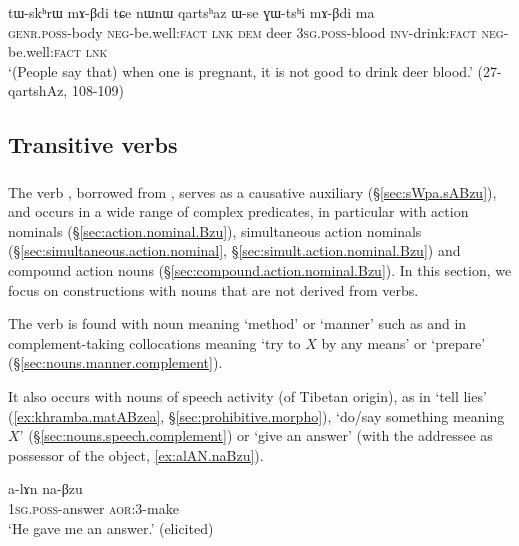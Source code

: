  \begin{exe}
\ex \label{ex:tWskhrW.mABdi}
\gll tɯ-skʰrɯ mɤ-βdi tɕe nɯnɯ qartsʰaz ɯ-se ɣɯ-tsʰi mɤ-βdi ma \\
\textsc{genr}.\textsc{poss}-body \textsc{neg}-be.well:\textsc{fact} \textsc{lnk} \textsc{dem} deer \textsc{3sg}.\textsc{poss}-blood \textsc{inv}-drink:\textsc{fact} \textsc{neg}-be.well:\textsc{fact} \textsc{lnk} \\
\glt `(People say that) when one is pregnant, it is not good to drink deer blood.' (27-qartshAz, 108-109)
\end{exe}


 
\subsection{Transitive verbs}  \label{sec:tr.light.verbs}

\subsubsection{ } \label{sec:Bzu.lv}
The verb , borrowed from , serves as a causative auxiliary (§\ref{sec:sWpa.sABzu}), and occurs in a wide range of complex predicates, in particular with action nominals (§\ref{sec:action.nominal.Bzu}), simultaneous action nominals (§\ref{sec:simultaneous.action.nominal}, §\ref{sec:simult.action.nominal.Bzu}) and compound action nouns (§\ref{sec:compound.action.nominal.Bzu}). In this section, we focus on constructions with nouns that are not derived from verbs.
  
The verb  is found with noun meaning `method' or `manner' such as   and  in complement-taking collocations meaning `try to $X$ by any means' or `prepare' (§\ref{sec:nouns.manner.complement}).
 
It also occurs with nouns of speech activity (of Tibetan origin), as in  `tell lies' (\ref{ex:khramba.matABzea}, §\ref{sec:prohibitive.morpho}),  `do/say something meaning $X$' (§\ref{sec:nouns.speech.complement}) or  `give an answer' (with the addressee as possessor of the object, \ref{ex:alAN.naBzu}).

 \begin{exe}
\ex \label{ex:alAN.naBzu}
\gll  a-lɤn na-βzu  \\
\textsc{1sg}.\textsc{poss}-answer \textsc{aor}:3\flobv{}-make \\
\glt `He gave me an answer.' (elicited)
  \end{exe}
  
